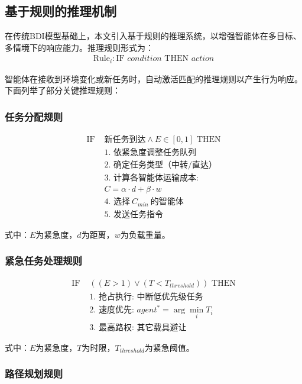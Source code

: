 \documentclass[12pt,a4paper]{article}
\begin{document}
\subsection{基于规则的推理机制}

在传统BDI模型基础上，本文引入基于规则的推理系统，以增强智能体在多目标、多情境下的响应能力。推理规则形式为：
\begin{align}
\text{Rule}_i: \text{IF } condition \text{ THEN } action
\end{align}

智能体在接收到环境变化或新任务时，自动激活匹配的推理规则以产生行为响应。下面列举了部分关键推理规则：

\subsubsection{任务分配规则}

\begin{align}
\text{IF } &\text{新任务到达} \wedge E \in [0,1] \text{ THEN} \\
&\text{1. 依紧急度调整任务队列} \\
&\text{2. 确定任务类型（中转/直达）} \\
&\text{3. 计算各智能体运输成本:} \\
&C = \alpha \cdot d + \beta \cdot w \\
&\text{4. 选择}\ C_{min}\ \text{的智能体} \\
&\text{5. 发送任务指令}
\end{align}

式中：$E$为紧急度，$d$为距离，$w$为负载重量。

\subsubsection{紧急任务处理规则}

\begin{align}
\text{IF } &((E > 1) \vee (T < T_{threshold})) \text{ THEN} \\
&\text{1. 抢占执行: 中断低优先级任务} \\
&\text{2. 速度优先: } agent^* = \arg\min_i T_i \\
&\text{3. 最高路权: 其它载具避让}
\end{align}

式中：$E$为紧急度，$T$为时限，$T_{threshold}$为紧急阈值。

\subsubsection{路径规划规则}
\end{document}
